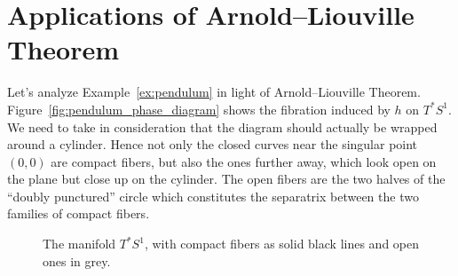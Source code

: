 \documentclass[main.tex]{subfiles}
\begin{document}
\section{Applications of Arnold--Liouville Theorem}
\begin{example}
	Let's analyze Example~\ref{ex:pendulum} in light of Arnold--Liouville Theorem. Figure~\ref{fig:pendulum_phase_diagram} shows the fibration induced by $h$ on $T^*S^1$. We need to take in consideration that the diagram should actually be wrapped around a cylinder. Hence not only the closed curves near the singular point $(0, 0)$ are compact fibers, but also the ones further away, which look open on the plane but close up on the cylinder. The open fibers are the two halves of the ``doubly punctured'' circle which constitutes the separatrix between the two families of compact fibers.

	\begin{figure}[H]
		\centering
		\caption{The manifold $T^* S^1$, with compact fibers as solid black lines and open ones in grey.}
	\end{figure}
\end{example}
\end{document}
